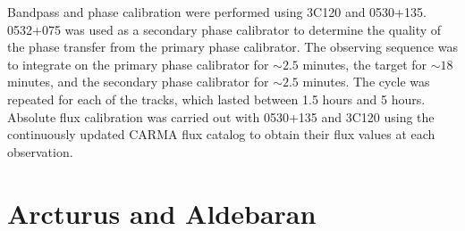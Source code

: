 Bandpass and phase calibration were performed using 3C120 and 0530+135. 0532+075 was used as a secondary phase calibrator to determine the quality of the phase transfer from the primary phase calibrator. The observing sequence was to integrate on the primary phase calibrator for $\sim 2.5$ minutes, the target for $\sim 18$ minutes, and the secondary phase calibrator for $\sim 2.5$ minutes. The cycle was repeated for each of the tracks, which lasted between 1.5 hours and 5 hours. Absolute flux calibration was carried out with 0530+135 and 3C120 using the continuously updated CARMA flux catalog to obtain their flux values at each observation.

\section{Arcturus and Aldebaran}\label{sec:3.4}

